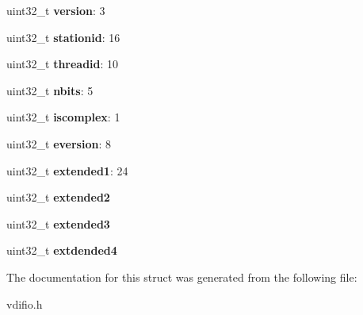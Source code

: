 \begin{DoxyCompactItemize}
\item 
\hypertarget{structvdif__header_ab5166af8945e84a09e1310f7596fe5dd}{}uint32\+\_\+t {\bfseries version}\+: 3\label{structvdif__header_ab5166af8945e84a09e1310f7596fe5dd}

\item 
\hypertarget{structvdif__header_ae9e774d7ed6ddbdaf5ebfad563dfecfd}{}uint32\+\_\+t {\bfseries stationid}\+: 16\label{structvdif__header_ae9e774d7ed6ddbdaf5ebfad563dfecfd}

\item 
\hypertarget{structvdif__header_a51297e1024de1aae2616fae3e6a7de80}{}uint32\+\_\+t {\bfseries threadid}\+: 10\label{structvdif__header_a51297e1024de1aae2616fae3e6a7de80}

\item 
\hypertarget{structvdif__header_ab28ad0b8cc849dca5326799d019b03e2}{}uint32\+\_\+t {\bfseries nbits}\+: 5\label{structvdif__header_ab28ad0b8cc849dca5326799d019b03e2}

\item 
\hypertarget{structvdif__header_a8e3409b18bde3712708b2c575e7c5f40}{}uint32\+\_\+t {\bfseries iscomplex}\+: 1\label{structvdif__header_a8e3409b18bde3712708b2c575e7c5f40}

\item 
\hypertarget{structvdif__header_a0937cbedabb923d9944525c5c63b2600}{}uint32\+\_\+t {\bfseries eversion}\+: 8\label{structvdif__header_a0937cbedabb923d9944525c5c63b2600}

\item 
\hypertarget{structvdif__header_aeeaf85e2f2931e30cd49d9c6d50c1248}{}uint32\+\_\+t {\bfseries extended1}\+: 24\label{structvdif__header_aeeaf85e2f2931e30cd49d9c6d50c1248}

\item 
\hypertarget{structvdif__header_ab8b79a7f415b7c358ffbfba1d4d56ad2}{}uint32\+\_\+t {\bfseries extended2}\label{structvdif__header_ab8b79a7f415b7c358ffbfba1d4d56ad2}

\item 
\hypertarget{structvdif__header_af0c0d46cf25a4ff0a934d69be24679e0}{}uint32\+\_\+t {\bfseries extended3}\label{structvdif__header_af0c0d46cf25a4ff0a934d69be24679e0}

\item 
\hypertarget{structvdif__header_a749e75c3b889697fc88bd545c8ee6722}{}uint32\+\_\+t {\bfseries extdended4}\label{structvdif__header_a749e75c3b889697fc88bd545c8ee6722}

\end{DoxyCompactItemize}


The documentation for this struct was generated from the following file\+:\begin{DoxyCompactItemize}
\item 
vdifio.\+h\end{DoxyCompactItemize}

